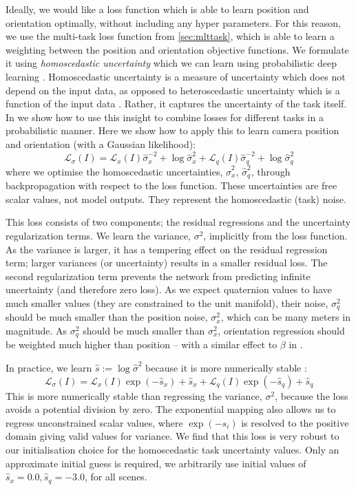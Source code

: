 Ideally, we would like a loss function which is able to learn position and orientation optimally, without including any hyper parameters. For this reason, we use the multi-task loss function from \cref{sec:mlttask}, which is able to learn a weighting between the position and orientation objective functions. We formulate it using \textit{homoscedastic uncertainty} which we can learn using probabilistic deep learning \citep{kendall2017uncertainties}. Homoscedastic uncertainty is a measure of uncertainty which does not depend on the input data, as opposed to heteroscedastic uncertainty which is a function of the input data \citep{kendall2017uncertainties}. Rather, it captures the uncertainty of the task itself. In \citep{kendall2017multi} we show how to use this insight to combine losses for different tasks in a probabilistic manner. Here we show how to apply this to learn camera position and orientation (with a Gaussian likelihood):
\begin{equation}
\label{eqn:loss4}
\mathcal{L}_{\sigma}(I) = \mathcal{L}_x(I) \hat{\sigma}_x^{-2} + \log{\hat{\sigma}_x^2} + \mathcal{L}_{q}(I) \hat{\sigma}_q^{-2} + \log{\hat{\sigma}_q^2}
\end{equation}
where we optimise the homoscedastic uncertainties, $\hat{\sigma}_x^2$, $\hat{\sigma}_q^2$, through backpropagation with respect to the loss function. These uncertainties are free scalar values, not model outputs. They represent the homoscedastic (task) noise.

This loss consists of two components; the residual regressions and the uncertainty regularization terms. We learn the variance, $\sigma^2$, implicitly from the loss function. As the variance is larger, it has a tempering effect on the residual regression term; larger variances (or uncertainty) results in a smaller residual loss. The second regularization term prevents the network from predicting infinite uncertainty (and therefore zero loss). As we expect quaternion values to have much smaller values (they are constrained to the unit manifold), their noise, $\sigma_q^2$ should be much smaller than the position noise, $\sigma_x^2$, which can be many meters in magnitude. As $\sigma_q^2$ should be much smaller than $\sigma_x^2$, orientation regression should be weighted much higher than position -- with a similar effect to $\beta$ in .

In practice, we learn $\hat{s}:=\log\hat{\sigma}^2$ because it is more numerically stable \citep{kendall2017multi}:
\begin{equation}
\label{eqn:loss5}
\mathcal{L}_{\sigma}(I) = \mathcal{L}_x(I) \exp (-\hat{s}_x) + \hat{s}_x + \mathcal{L}_{q}(I) \exp (-\hat{s}_q) + \hat{s}_q
\end{equation}
This is more numerically stable than regressing the variance, $\sigma^2$, because the loss avoids a potential division by zero. The exponential mapping also allows us to regress unconstrained scalar values, where $\exp(-s_i)$ is resolved to the positive domain giving valid values for variance. We find that this loss is very robust to our initialisation choice for the homoscedastic task uncertainty values. Only an approximate initial guess is required, we arbitrarily use initial values of $\hat{s}_x=0.0, \hat{s}_q=-3.0$, for all scenes.

